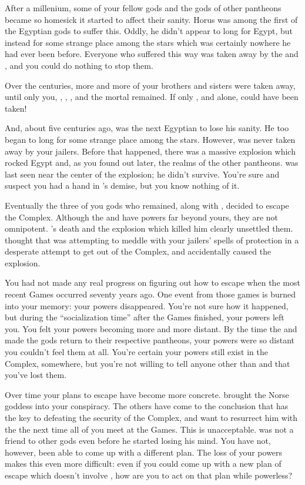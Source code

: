 \documentclass[char]{guardians}
\begin{document}
After a millenium, some of your fellow gods and the gods of other pantheons became so homesick it started to affect their sanity. Horus was among the first of the Egyptian gods to suffer this. Oddly, he didn't appear to long for Egypt, but instead for some strange place among the stars which was certainly nowhere he had ever been before. Everyone who suffered this way was taken away by the \cCaretaker{} and \cWarden{}, and you could do nothing to stop them.

Over the centuries, more and more of your brothers and sisters were taken away, until only you, \cIsis{}, \cAnubis{}, \cSet{}, and the mortal \cEgyptianHuman{} remained. If only \cSet{}, and \cSet{} alone, could have been taken!

And, about five centuries ago, \cSet{} was the next Egyptian to lose his sanity. He too began to long for some strange place among the stars. However, \cSet{} was never taken away by your jailers. Before that happened, there was a massive explosion which rocked Egypt and, as you found out later, the realms of the other pantheons. \cSet{} was last seen near the center of the explosion; he didn't survive. You're sure \cIsis{} and \cAnubis{} suspect you had a hand in \cSet{}'s demise, but you know nothing of it.

Eventually the three of you gods who remained, along with \cEgyptianHuman{}, decided to escape the Complex. Although the \cWarden{} and \cCaretaker{} have powers far beyond yours, they are not omnipotent. \cSet{}'s death and the explosion which killed him clearly unsettled them. \cAnubis{} thought that \cSet{} was attempting to meddle with your jailers' spells of protection in a desperate attempt to get out of the Complex, and accidentally caused the explosion.

You had not made any real progress on figuring out how to escape when the most recent Games occurred seventy years ago. One event from those games is burned into your memory: your powers disappeared. You're not sure how it happened, but during the ``socialization time'' after the Games finished, your powers left you. You felt your powers becoming more and more distant. By the time the \cWarden{} and \cCaretaker{} made the gods return to their respective pantheons, your powers were so distant you couldn't feel them at all. You're certain your powers still exist in the Complex, somewhere, but you're not willing to tell anyone other than \cIsis{} and \cAnubis{} that you've lost them.

Over time your plans to escape have become more concrete. \cIsis{} brought the Norse goddess \cHel{} into your conspiracy. The others have come to the conclusion that \cSet{} has the key to defeating the security of the Complex, and want to resurrect him with the \iNecro{\MYname} the next time all of you meet at the Games. This is unacceptable. \cSet{} was not a friend to other gods even before he started losing his mind. You have not, however, been able to come up with a different plan. The loss of your powers makes this even more difficult: even if you could come up with a new plan of escape which doesn't involve \cSet{}, how are you to act on that plan while powerless?
\end{document}
